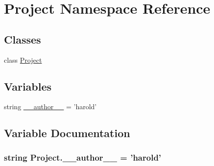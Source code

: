 \hypertarget{namespace_project}{\section{Project Namespace Reference}
\label{namespace_project}
}
\subsection*{Classes}
\begin{DoxyCompactItemize}
\item 
class \hyperlink{class_project_1_1_project}{Project}
\end{DoxyCompactItemize}
\subsection*{Variables}
\begin{DoxyCompactItemize}
\item 
string \hyperlink{namespace_project_a331f28f8219f8f190a6a1f0dbf9b3d54}{\-\_\-\-\_\-author\-\_\-\-\_\-} = 'harold'
\end{DoxyCompactItemize}


\subsection{Variable Documentation}
\hypertarget{namespace_project_a331f28f8219f8f190a6a1f0dbf9b3d54}{
\subsubsection[{\-\_\-\-\_\-author\-\_\-\-\_\-}]{\setlength{\rightskip}{0pt plus 5cm}string Project.\-\_\-\-\_\-author\-\_\-\-\_\- = 'harold'}}\label{namespace_project_a331f28f8219f8f190a6a1f0dbf9b3d54}
